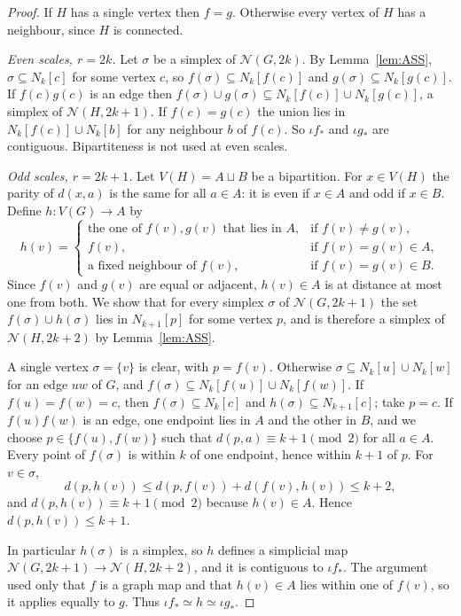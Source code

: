 \documentclass[11pt]{amsart}
\theoremstyle{remark}
\newcommand{\N}{\mathcal{N}}
\newcommand{\cl}[2]{N_{#1}[#2]}
\begin{document}
\begin{proof}
If $H$ has a single vertex then $f=g$. Otherwise every vertex of $H$ has a neighbour, since $H$ is connected.

\emph{Even scales, $r=2k$.} Let $\sigma$ be a simplex of $\N(G,2k)$. By Lemma~\ref{lem:ASS},
$\sigma\subseteq\cl kc$ for some vertex $c$, so $f(\sigma)\subseteq\cl k{f(c)}$ and $g(\sigma)\subseteq\cl k{g(c)}$. If
$f(c)g(c)$ is an edge then $f(\sigma)\cup g(\sigma)\subseteq\cl k{f(c)}\cup\cl k{g(c)}$, a simplex of $\N(H,2k+1)$. If
$f(c)=g(c)$ the union lies in $\cl k{f(c)}\cup\cl kb$ for any neighbour $b$ of $f(c)$. So $\iota f_*$ and $\iota g_*$
are contiguous. Bipartiteness is not used at even scales.

\emph{Odd scales, $r=2k+1$.} Let $V(H)=A\sqcup B$ be a bipartition. For $x\in V(H)$ the parity of $d(x,a)$ is the same
for all $a\in A$: it is even if $x\in A$ and odd if $x\in B$. Define $h\colon V(G)\to A$ by
\[
h(v)=\begin{cases}
\text{the one of }f(v),g(v)\text{ that lies in }A,&\text{if }f(v)\ne g(v),\\
f(v),&\text{if }f(v)=g(v)\in A,\\
\text{a fixed neighbour of }f(v),&\text{if }f(v)=g(v)\in B.
\end{cases}
\]
Since $f(v)$ and $g(v)$ are equal or adjacent, $h(v)\in A$ is at distance at most one from both. We show that for every
simplex $\sigma$ of $\N(G,2k+1)$ the set $f(\sigma)\cup h(\sigma)$ lies in $\cl{k+1}p$ for some vertex $p$, and is
therefore a simplex of $\N(H,2k+2)$ by Lemma~\ref{lem:ASS}.

A single vertex $\sigma=\{v\}$ is clear, with $p=f(v)$. Otherwise $\sigma\subseteq\cl ku\cup\cl kw$ for an edge $uw$ of
$G$, and $f(\sigma)\subseteq\cl k{f(u)}\cup\cl k{f(w)}$. If $f(u)=f(w)=c$, then $f(\sigma)\subseteq\cl kc$ and
$h(\sigma)\subseteq\cl{k+1}c$; take $p=c$. If $f(u)f(w)$ is an edge, one endpoint lies in $A$ and the other in $B$, and
we choose $p\in\{f(u),f(w)\}$ such that $d(p,a)\equiv k+1\pmod 2$ for all $a\in A$. Every point of $f(\sigma)$ is within
$k$ of one endpoint, hence within $k+1$ of $p$. For $v\in\sigma$,
\[
d(p,h(v))\le d(p,f(v))+d(f(v),h(v))\le k+2,
\]
and $d(p,h(v))\equiv k+1\pmod2$ because $h(v)\in A$. Hence $d(p,h(v))\le k+1$.

In particular $h(\sigma)$ is a simplex, so $h$ defines a simplicial map $\N(G,2k+1)\to\N(H,2k+2)$, and it is
contiguous to $\iota f_*$. The argument used only that $f$ is a graph map and that $h(v)\in A$ lies within one of $f(v)$,
so it applies equally to $g$. Thus $\iota f_*\simeq h\simeq\iota g_*$.
\end{proof}
\end{document}
